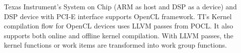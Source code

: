 Texas Instrument's System on Chip (ARM as host and DSP as a device)\cite{15} and DSP device with PCI-E interface supports OpenCL framework. TI's Kernel compilation flow for OpenCL devices uses LLVM passes from POCL. It also supports both online and offline kernel compilation. With LLVM passes, the kernel functions or work items are transformed into work group functions.
